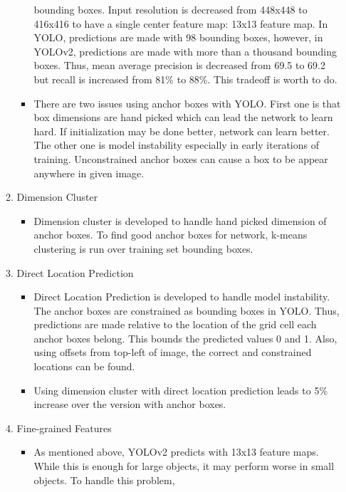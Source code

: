 \documentclass{article}
\begin{document}
\begin{enumerate}
\begin{enumerate}
\begin{itemize}
        bounding boxes. Input resolution is decreased from 448x448 to 416x416
        to have a single center feature map: 13x13 feature map. In YOLO, 
        predictions are made with 98 bounding boxes, however, in YOLOv2, 
        predictions are made with more than a thousand bounding boxes.
        Thus, mean average precision is decreased from 69.5 to 69.2 but 
        recall is increased from 81\% to 88\%. This tradeoff is worth to do.
            \item There are two issues using anchor boxes with YOLO. First 
        one is that box dimensions are hand picked which can lead the network 
        to learn hard. If initialization may be done better, network can learn 
        better. The other one is model instability especially in early iterations 
        of training. Unconstrained anchor boxes can cause a box to be appear anywhere 
        in given image.
        \end{itemize}
        \item Dimension Cluster
        \begin{itemize}
            \item Dimension cluster is developed to handle hand picked dimension
        of anchor boxes. To find good anchor boxes for network, k-means clustering is run 
        over training set bounding boxes. 
        \end{itemize}
        \item Direct Location Prediction
        \begin{itemize}
            \item Direct Location Prediction is developed to handle model instability. 
        The anchor boxes are constrained as bounding boxes in YOLO. Thus, predictions 
        are made relative to the location of the grid cell each anchor boxes belong. This 
        bounds the predicted values 0 and 1. Also, using offsets from top-left of image, the 
        correct and constrained locations can be found. 
            \item Using dimension cluster with direct location prediction leads to 5\% increase 
        over the version with anchor boxes.
        \end{itemize}
        \item Fine-grained Features
        \begin{itemize}
            \item As mentioned above, YOLOv2 predicts with 13x13 feature maps. While this is 
        enough for large objects, it may perform worse in small objects. To handle this problem, 

\end{itemize}
\end{enumerate}
\end{enumerate}
\end{document}

